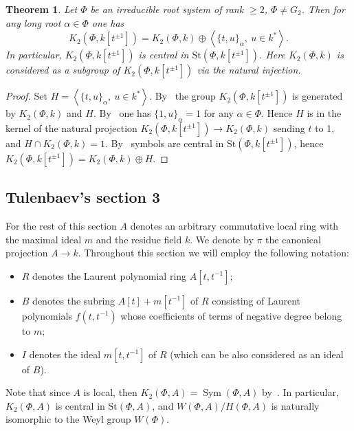 \documentclass[oneside,12pt]{amsart}
\newtheorem{thm}{Theorem}
\numberwithin{equation}{section}
\numberwithin{lem}{section}
\theoremstyle{definition}
\theoremstyle{remark}
\newcommand{\Stb}{\mathrm{St}}
\DeclareMathOperator{\Stsym}{Sym}
\begin{document}
\begin{thm}\label{thm:k[t+-1]}
Let $\Phi$ be an irreducible root system of rank $\geq 2$, $\Phi\neq G_2$.
Then for any long root $\alpha\in\Phi$ one has
$$
K_2(\Phi,k[t^{\pm 1}])=K_2(\Phi,k)\oplus
\left<\{t,u\}_\alpha,\ u\in k^*\right>.
$$
In particular, $K_2(\Phi,k[t^{\pm 1}])$ is central in $\Stb(\Phi,k[t^{\pm 1}])$.
Here $K_2(\Phi,k)$ is considered as a subgroup of $K_2(\Phi,k[t^{\pm 1}])$ via the natural injection.
\end{thm}
\begin{proof}
Set $H=\left<\{t,u\}_\alpha,\ u\in k^*\right>$.
By~\cite[Korollar 4]{Hur77} the group $K_2(\Phi,k[t^{\pm 1}])$ is generated by $K_2(\Phi,k)$ and
$H$. By~\cite[Prop. 1.1 (S1)]{Ste73} one has $\{1,u\}_\alpha=1$
for any $\alpha\in\Phi$. Hence $H$ is in the kernel of the natural projection $K_2(\Phi,k[t^{\pm 1}])\to K_2(\Phi,k)$
sending $t$ to 1, and $H\cap K_2(\Phi,k)=1$. By~\cite[Prop. 1.3 (a)]{Ste73} symbols are central in
$\Stb(\Phi,k[t^{\pm 1}])$, hence $K_2(\Phi,k[t^{\pm 1}])=K_2(\Phi,k)\oplus H$.
\end{proof}


\subsection{Tulenbaev's section 3}


For the rest of this section $A$ denotes an arbitrary commutative local ring with the maximal ideal $m$
and the residue field $k$.
We denote by $\pi$ the canonical projection $A \rightarrow k$.
Throughout this section we will employ the following notation:
\begin{itemize}
 \item $R$ denotes the Laurent polynomial ring $A[t, t^{-1}]$;
 \item $B$ denotes the subring $A[t] + m[t^{-1}]$ of $R$ consisting of Laurent polynomials $f(t,t^{-1})$ whose coefficients of terms of negative degree belong to $m$;
 \item $I$ denotes the ideal $m[t, t^{-1}]$ of $R$ (which can be also considered as an ideal of $B$).
\end{itemize}

Note that since $A$ is local, then $K_2(\Phi,A)=\Stsym(\Phi,A)$
by~\cite[Theorem 2.13]{Ste73}. In particular, $K_2(\Phi,A)$ is central in $\Stb(\Phi,A)$,
and $W(\Phi,A)/H(\Phi,A)$ is naturally isomorphic
to the Weyl group $W(\Phi)$.
\end{document}
